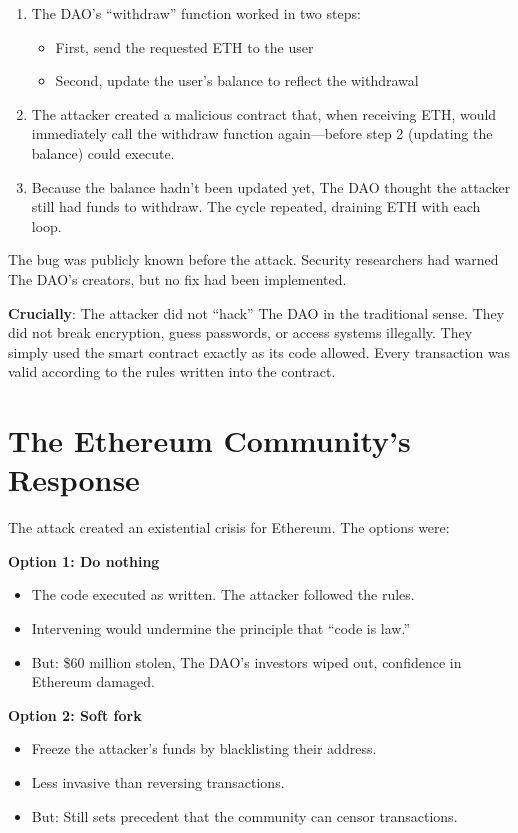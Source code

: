 \documentclass[11pt]{article}
\begin{document}
\begin{enumerate}[leftmargin=*]
\item The DAO's ``withdraw'' function worked in two steps:
\begin{itemize}
\item First, send the requested ETH to the user
\item Second, update the user's balance to reflect the withdrawal
\end{itemize}

\item The attacker created a malicious contract that, when receiving ETH, would immediately call the withdraw function again---before step 2 (updating the balance) could execute.

\item Because the balance hadn't been updated yet, The DAO thought the attacker still had funds to withdraw. The cycle repeated, draining ETH with each loop.
\end{enumerate}

The bug was publicly known before the attack. Security researchers had warned The DAO's creators, but no fix had been implemented.

\medskip
\noindent\textbf{Crucially}: The attacker did not ``hack'' The DAO in the traditional sense. They did not break encryption, guess passwords, or access systems illegally. They simply used the smart contract exactly as its code allowed. Every transaction was valid according to the rules written into the contract.

\section*{The Ethereum Community's Response}

The attack created an existential crisis for Ethereum. The options were:

\medskip
\noindent\textbf{Option 1: Do nothing}
\begin{itemize}[leftmargin=*]
\item The code executed as written. The attacker followed the rules.
\item Intervening would undermine the principle that ``code is law.''
\item But: \$60 million stolen, The DAO's investors wiped out, confidence in Ethereum damaged.
\end{itemize}

\medskip
\noindent\textbf{Option 2: Soft fork}
\begin{itemize}[leftmargin=*]
\item Freeze the attacker's funds by blacklisting their address.
\item Less invasive than reversing transactions.
\item But: Still sets precedent that the community can censor transactions.
\end{itemize}
\end{document}
